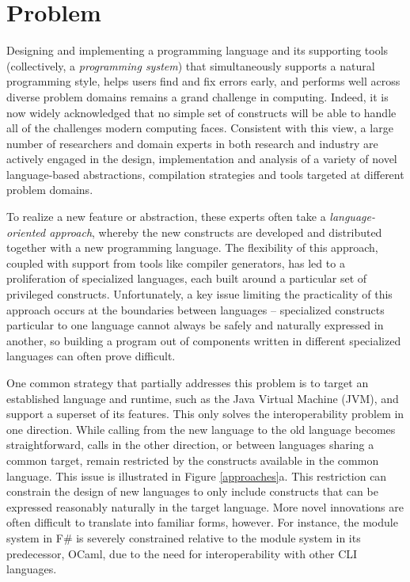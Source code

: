\section{Problem}

Designing and implementing a programming language and its supporting tools (collectively, a \emph{programming system}) that simultaneously supports a natural programming style, helps users find and fix errors early, and performs well across diverse problem domains remains a grand challenge in computing. Indeed, it is now widely acknowledged that no simple set of constructs will be able to handle all of the challenges modern computing faces. Consistent with this view, a large number of researchers and domain experts in both research and industry are actively engaged in the design, implementation and analysis of a variety of novel language-based abstractions, compilation strategies and tools targeted at different problem domains.

To realize a new feature or abstraction, these experts often take a \emph{language-oriented approach}, whereby the new constructs are developed and distributed together with a new programming language. The flexibility of this approach, coupled with support from tools like compiler generators, has led to a proliferation of specialized languages, each built around a particular set of privileged constructs. Unfortunately, a key issue limiting the practicality of this approach occurs at the boundaries between languages -- specialized constructs particular to one language cannot always be safely and naturally expressed in another, so building a program out of components written in different specialized languages can often prove difficult. 

One common strategy that partially addresses this problem is to target an established language and runtime, such as the Java Virtual Machine (JVM), and support a superset of its features. This only solves the interoperability problem in one direction. While calling from the new language to the old language becomes straightforward, calls in the other direction, or between languages sharing a common target, remain restricted by the constructs available in the common language. This issue is illustrated in Figure \ref{approaches}a. This restriction can  constrain the design of new languages to only include constructs that can be expressed reasonably naturally in the target language. More novel innovations are often difficult to translate into familiar forms, however. For instance, the module system in F\# is severely constrained relative to the module system in its predecessor, OCaml, due to the need for interoperability with other CLI languages.

